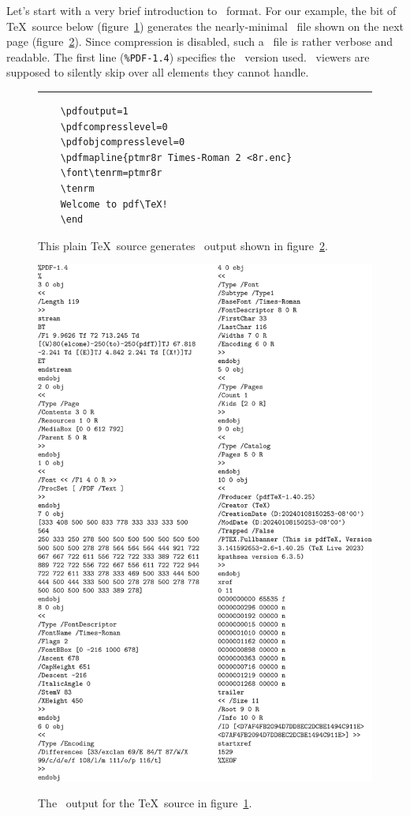 \documentclass{pdftexmanual}
\begin{document}
Let's start with a very brief introduction to \PDF\ format. For our
example, the bit of \TeX\ source below (figure~\ref{fig.titlesource})
generates the nearly-minimal \PDF\ file shown on the next page
(figure~\ref{fig.titleout}). Since compression is disabled, such a
\PDF\ file is rather verbose and readable. The first line
(\texttt{\%PDF-1.4}) specifies the \PDF\ version used. \PDF\ viewers are
supposed to silently skip over all elements they cannot handle.

\begin{figure}[b]
\bigskip
\hrule
\medskip
\begin{verbatim}
    \pdfoutput=1
    \pdfcompresslevel=0
    \pdfobjcompresslevel=0
    \pdfmapline{ptmr8r Times-Roman 2 <8r.enc}
    \font\tenrm=ptmr8r
    \tenrm
    Welcome to pdf\TeX!
    \end
\end{verbatim}
\vspace{-\baselineskip}
\caption{This plain \TeX\ source generates \PDF\ output shown in
  figure~\ref{fig.titleout}.}
\label{fig.titlesource}
\end{figure}

\begin{figure}[p]
\includegraphics[height=1.27\vsize,alt={small PDF file}]
                      {incl/pdfmin-crop.pdf}
\caption{The \PDF\ output for the \TeX\ source in figure~\ref{fig.titlesource}.}
\label{fig.titleout}
\end{figure}
\end{document}
